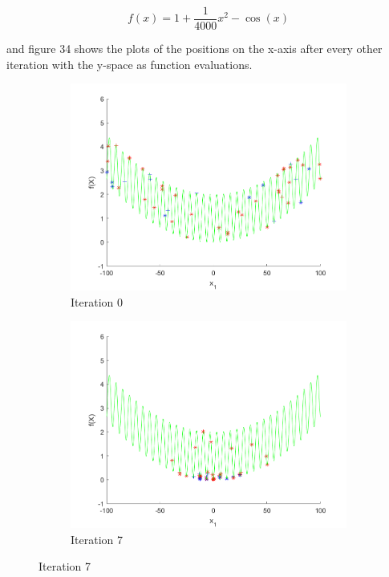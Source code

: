 $$
  f(x) = 1 + \frac{1}{4000}x^2 - \cos(x)
$$

and figure 34 shows the plots of the positions on the x-axis after every other iteration with the y-space as function evaluations.

\begin{figure}
 \begin{subfigure}[b]{0.4\textwidth}
   \includegraphics[width=\textwidth]{img/smpl/grwnk1d/loa-iter-0}
   \caption{Iteration 0}
   \label{fig:s3-iter-0}
 \end{subfigure}
 \begin{subfigure}[b]{0.4\textwidth}
   \includegraphics[width=\textwidth]{img/smpl/grwnk1d/loa-iter-7}
   \caption{Iteration 7}
   \label{fig:s3-iter-1}

\end{subfigure}
\end{figure}
